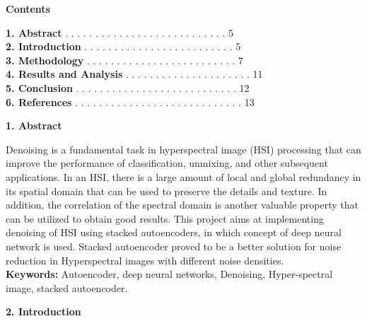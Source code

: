 \documentclass{article}
\begin{document}
\newpage

\begin{flushleft}
\textbf{\Large Contents}
\end{flushleft}

\begin{center}
\end{center}

\begin{flushleft}
\textbf{1. Abstract} . . . . . . . . . . . . . . . . . . . . . . . . . . . 5\\
\textbf{2. Introduction} . . . . . . . . . . . . . . . . . . . . . . . . . 5\\
\textbf{3. Methodology} . . . . . . . . . . . . . . . . . . . . . . . . . 7\\
\textbf{4. Results and Analysis} . . . . . . . . . . . . . . . . . . . . . 11\\
\textbf{5. Conclusion} . . . . . . . . . . . . . . . . . . . . . . . . . . . 12\\
\textbf{6. References} . . . . . . . . . . . . . . . . . . . . . . . . . . . . 13\\
\end{flushleft}


\newpage


\begin{flushleft}
\textbf{\large 1. Abstract}
\end{flushleft}

Denoising is a fundamental task in hyperspectral image (HSI) processing that can improve the performance of classification, unmixing, and other subsequent applications. In an HSI, there is a large amount of local and global redundancy in its spatial domain that can be used to preserve the details and texture. In addition, the correlation of the spectral domain is another valuable property that can be utilized to obtain good results. This project aims at implementing denoising of HSI using stacked autoencoders, in which concept of deep neural network is used. Stacked autoencoder proved to be a better solution for noise reduction in Hyperspectral images with different noise densities.\\

\textbf{Keywords:} Autoencoder, deep neural networks, Denoising, Hyper-spectral image, stacked autoencoder.\\



\begin{flushleft}
\textbf{\large 2. Introduction}
\end{flushleft}
\end{document}
